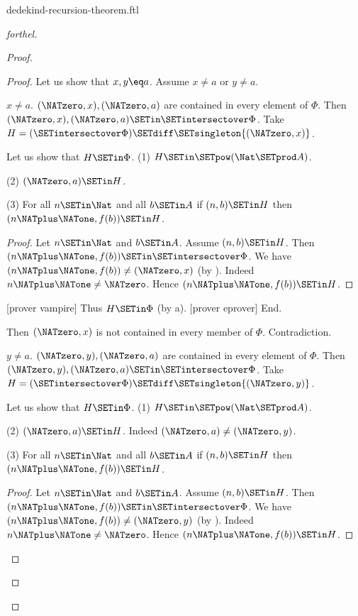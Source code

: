 \documentclass{stex}
\begin{document}
\begin{smodule}{dedekind-recursion-theorem.ftl}
\begin{proof}[forthel]
\begin{proof}
\begin{proof}
        Let us show that $x, y \eq a$.
          Assume $x \neq a$ or $y \neq a$.

          \begin{case}{$x \neq a$.}
            $(\NATzero,x), (\NATzero,a)$ are contained in every element of $\Phi$.
            Then $(\NATzero,x), (\NATzero,a) \SETin \SETintersectover \Phi$.
            Take $H = (\SETintersectover \Phi) \SETdiff \SETsingleton{(\NATzero,x)}$.

            Let us show that $H \SETin \Phi$.
              (1) $H \SETin \SETpow(\Nat \SETprod A)$.

              (2) $(\NATzero,a) \SETin H$.

              (3) For all $n \SETin \Nat$ and all $b \SETin A$ if
              $(n,b) \SETin H$ then $(n \NATplus \NATone, f(b)) \SETin H$.
              \begin{proof}
                Let $n \SETin \Nat$ and $b \SETin A$.
                Assume $(n,b) \SETin H$.
                Then $(n \NATplus \NATone, f(b)) \SETin \SETintersectover \Phi$.
                We have $(n \NATplus \NATone, f(b)) \neq (\NATzero,x)$ (by ).
                Indeed $n \NATplus \NATone \neq \NATzero$.
                Hence $(n \NATplus \NATone, f(b)) \SETin H$.
              \end{proof}

              [prover vampire]
              Thus $H \SETin \Phi$ (by a).
              [prover eprover]
            End.

            Then $(\NATzero,x)$ is not contained in every member of $\Phi$.
            Contradiction.
          \end{case}

          \begin{case}{$y \neq a$.}
            $(\NATzero,y), (\NATzero,a)$ are contained in every element of $\Phi$.
            Then $(\NATzero,y), (\NATzero,a) \SETin \SETintersectover \Phi$.
            Take $H = (\SETintersectover \Phi) \SETdiff \SETsingleton{(\NATzero,y)}$.

            Let us show that $H \SETin \Phi$.
              (1) $H \SETin \SETpow(\Nat \SETprod A)$.

              (2) $(\NATzero,a) \SETin H$.
              Indeed $(\NATzero,a) \neq (\NATzero,y)$.

              (3) For all $n \SETin \Nat$ and all $b \SETin A$ if
              $(n,b) \SETin H$ then $(n \NATplus \NATone, f(b)) \SETin H$.
              \begin{proof}
                Let $n \SETin \Nat$ and $b \SETin A$.
                Assume $(n,b) \SETin H$.
                Then $(n \NATplus \NATone, f(b)) \SETin \SETintersectover \Phi$.
                We have $(n \NATplus \NATone, f(b)) \neq (\NATzero,y)$ (by ).
                Indeed $n \NATplus \NATone \neq \NATzero$.
                Hence $(n \NATplus \NATone, f(b)) \SETin H$.
              \end{proof}


\end{case}
\end{proof}
\end{proof}
\end{proof}
\end{smodule}
\end{document}
